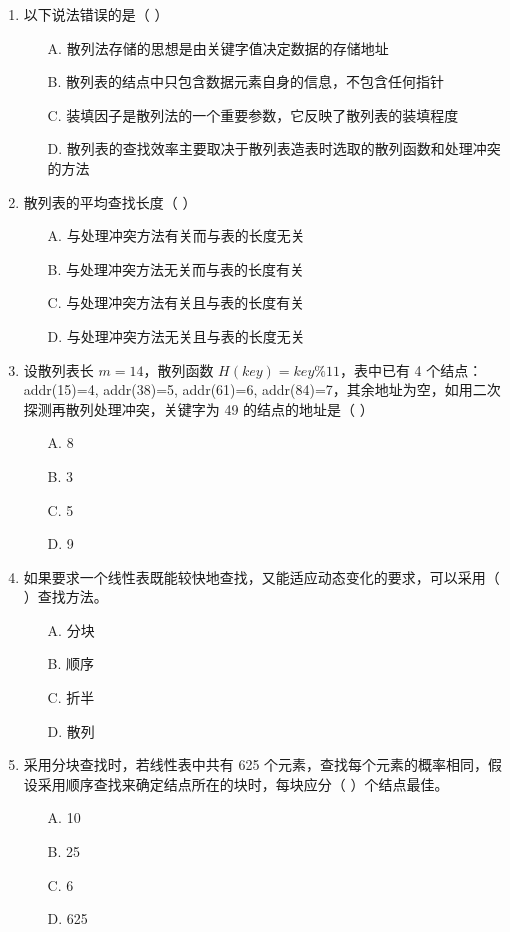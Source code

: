\documentclass[12pt, a4paper]{article}
\begin{document}
\begin{enumerate}[label=\arabic*.]
	\item 以下说法错误的是（ ）
	      \begin{enumerate}
		      \item[A.] 散列法存储的思想是由关键字值决定数据的存储地址
		      \item[B.] 散列表的结点中只包含数据元素自身的信息，不包含任何指针
		      \item[C.] 装填因子是散列法的一个重要参数，它反映了散列表的装填程度
		      \item[D.] 散列表的查找效率主要取决于散列表造表时选取的散列函数和处理冲突的方法
	      \end{enumerate}

	\item 散列表的平均查找长度（ ）
	      \begin{enumerate}
		      \item[A.] 与处理冲突方法有关而与表的长度无关
		      \item[B.] 与处理冲突方法无关而与表的长度有关
		      \item[C.] 与处理冲突方法有关且与表的长度有关
		      \item[D.] 与处理冲突方法无关且与表的长度无关
	      \end{enumerate}

	\item 设散列表长 $m=14$，散列函数 $H(key)=key \% 11$，表中已有 4 个结点：addr(15)=4, addr(38)=5, addr(61)=6, addr(84)=7，其余地址为空，如用二次探测再散列处理冲突，关键字为 49 的结点的地址是（ ）
	      \begin{enumerate}
		      \item[A.] 8
		      \item[B.] 3
		      \item[C.] 5
		      \item[D.] 9
	      \end{enumerate}

	\item 如果要求一个线性表既能较快地查找，又能适应动态变化的要求，可以采用（ ）查找方法。
	      \begin{enumerate}
		      \item[A.] 分块
		      \item[B.] 顺序
		      \item[C.] 折半
		      \item[D.] 散列
	      \end{enumerate}

	\item 采用分块查找时，若线性表中共有 625 个元素，查找每个元素的概率相同，假设采用顺序查找来确定结点所在的块时，每块应分（ ）个结点最佳。
	      \begin{enumerate}
		      \item[A.] 10
		      \item[B.] 25
		      \item[C.] 6
		      \item[D.] 625
	      \end{enumerate}


\end{enumerate}
\end{document}
